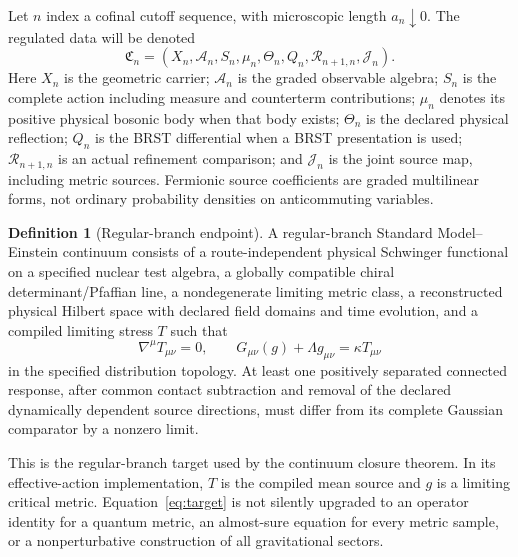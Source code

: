 \documentclass[11pt,a4paper,oneside]{book}
\theoremstyle{plain}
\theoremstyle{definition}
\newtheorem{definition}[theorem]{Definition}
\theoremstyle{remark}
\renewcommand{\AA}{\mathcal A}
\newcommand{\src}[2]{\cite{#1}}
\begin{document}
Let $n$ index a cofinal cutoff sequence, with microscopic length $a_n\downarrow0$. The regulated data will be denoted
\begin{equation}
 \mathfrak C_n=(X_n,\AA_n,S_n,\mu_n,\Theta_n,Q_n,\mathcal R_{n+1,n},\mathcal J_n).
 \label{eq:common-card}
\end{equation}
Here $X_n$ is the geometric carrier; $\AA_n$ is the graded observable algebra; $S_n$ is the complete action including measure and counterterm contributions; $\mu_n$ denotes its positive physical bosonic body when that body exists; $\Theta_n$ is the declared physical reflection; $Q_n$ is the BRST differential when a BRST presentation is used; $\mathcal R_{n+1,n}$ is an actual refinement comparison; and $\mathcal J_n$ is the joint source map, including metric sources. Fermionic source coefficients are graded multilinear forms, not ordinary probability densities on anticommuting variables.

\begin{definition}[Regular-branch endpoint]
\label{def:endpoint}
A regular-branch Standard Model--Einstein continuum consists of a route-independent physical Schwinger functional on a specified nuclear test algebra, a globally compatible chiral determinant/Pfaffian line, a nondegenerate limiting metric class, a reconstructed physical Hilbert space with declared field domains and time evolution, and a compiled limiting stress $T$ such that
\begin{equation}
 \nabla^\mu T_{\mu\nu}=0,
 \qquad G_{\mu\nu}(g)+\Lambda g_{\mu\nu}=\kappa T_{\mu\nu}
 \label{eq:target}
\end{equation}
in the specified distribution topology. At least one positively separated connected response, after common contact subtraction and removal of the declared dynamically dependent source directions, must differ from its complete Gaussian comparator by a nonzero limit.
\end{definition}
This is the regular-branch target used by the continuum closure theorem. In its effective-action implementation, $T$ is the compiled mean source and $g$ is a limiting critical metric. Equation~\eqref{eq:target} is not silently upgraded to an operator identity for a quantum metric, an almost-sure equation for every metric sample, or a nonperturbative construction of all gravitational sectors. \src{R18}{def:v18v51-hypotheses,thm:v18v51-conditional-closure}
\end{document}
